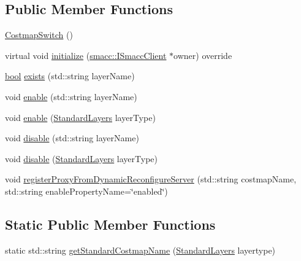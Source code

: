 \subsection*{Public Member Functions}
\begin{DoxyCompactItemize}
\item 
\hyperlink{classmove__base__z__client_1_1CostmapSwitch_ae77880f076caaf540b122232dc2c838a}{Costmap\+Switch} ()
\item 
virtual void \hyperlink{classmove__base__z__client_1_1CostmapSwitch_a6708159a16847c912e2d1e44c354983a}{initialize} (\hyperlink{classsmacc_1_1ISmaccClient}{smacc\+::\+I\+Smacc\+Client} $\ast$owner) override
\item 
\hyperlink{classbool}{bool} \hyperlink{classmove__base__z__client_1_1CostmapSwitch_a3898ad9aa2ecf59d29a99e152f21a0d4}{exists} (std\+::string layer\+Name)
\item 
void \hyperlink{classmove__base__z__client_1_1CostmapSwitch_ab605fa05a9e899c58f8502990e91586a}{enable} (std\+::string layer\+Name)
\item 
void \hyperlink{classmove__base__z__client_1_1CostmapSwitch_a4f67bece32c5a66222bda0144d8f74d5}{enable} (\hyperlink{classmove__base__z__client_1_1CostmapSwitch_a810338d2ba3fe25fc4ecf8c6c85b462b}{Standard\+Layers} layer\+Type)
\item 
void \hyperlink{classmove__base__z__client_1_1CostmapSwitch_a14a70c2952a2bf34b2f8a383fdd5841f}{disable} (std\+::string layer\+Name)
\item 
void \hyperlink{classmove__base__z__client_1_1CostmapSwitch_acc493a0039e529f11b3f49818f38c5ff}{disable} (\hyperlink{classmove__base__z__client_1_1CostmapSwitch_a810338d2ba3fe25fc4ecf8c6c85b462b}{Standard\+Layers} layer\+Type)
\item 
void \hyperlink{classmove__base__z__client_1_1CostmapSwitch_a0282cb1651dd50803e3af0de1436635f}{register\+Proxy\+From\+Dynamic\+Reconfigure\+Server} (std\+::string costmap\+Name, std\+::string enable\+Property\+Name=\char`\"{}enabled\char`\"{})
\end{DoxyCompactItemize}
\subsection*{Static Public Member Functions}
\begin{DoxyCompactItemize}
\item 
static std\+::string \hyperlink{classmove__base__z__client_1_1CostmapSwitch_ae8635d58b81be774e18eb4afa99413e1}{get\+Standard\+Costmap\+Name} (\hyperlink{classmove__base__z__client_1_1CostmapSwitch_a810338d2ba3fe25fc4ecf8c6c85b462b}{Standard\+Layers} layertype)
\end{DoxyCompactItemize}
